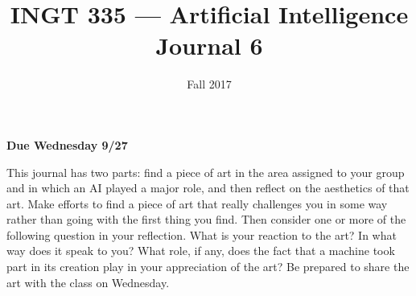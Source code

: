 \documentclass[nobib]{tufte-handout}
\title{INGT 335 --- Artificial Intelligence \\ Journal 6}
\author{}
\date{ Fall 2017 }
\begin{document}
\maketitle

\begin{center}
  \textbf{Due Wednesday 9/27}
\end{center}

This journal has two parts: find a piece of art in the area assigned to your group and in which an AI played a major role, and then reflect on the aesthetics of that art. Make efforts to find a piece of art that really challenges you in some way rather than going with the first thing you find. Then consider one or more of the following question in your reflection. What is your reaction to the art? In what way does it speak to you? What role, if any, does the fact that a machine took part in its creation play in your appreciation of the art?  Be prepared to share the art with the class on Wednesday.
\end{document}
